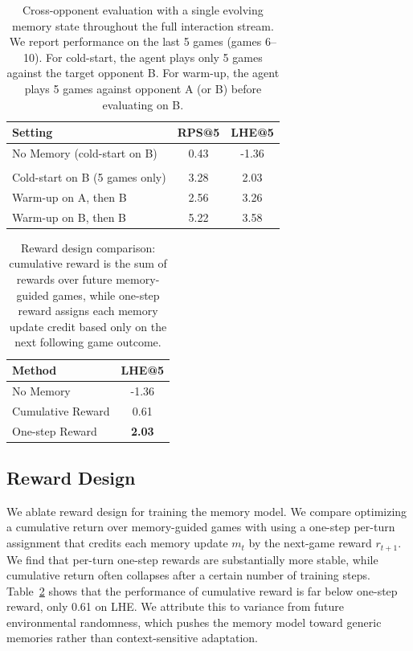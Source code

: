 \documentclass{article}
\newcommand{\methodname}{MemoPilot}
\newcommand{\method}{\textsc{\methodname}}
\theoremstyle{plain}
\theoremstyle{definition}
\theoremstyle{remark}
\begin{document}
\begin{table}[t]
\centering
\caption{Cross-opponent evaluation with a single evolving memory state throughout the full interaction stream. We report performance on the last 5 games (games 6--10). For cold-start, the agent plays only 5 games against the target opponent B. For warm-up, the agent plays 5 games against opponent A (or B) before evaluating on B.}
\label{tab:cross_opponent}
\small
\begin{tabular}{lcc}
\toprule
\textbf{Setting} & \textbf{RPS@5}  & \textbf{LHE@5} \\
\midrule
No Memory (cold-start on B) & 0.43 & -1.36 \\
\midrule
\rowcolor{gray!10} \multicolumn{3}{l}{\textit{Memory w/ \method{}}} \\
Cold-start on B (5 games only) & 3.28 & 2.03 \\
Warm-up on A, then B & 2.56 & 3.26 \\
Warm-up on B, then B & 5.22 & 3.58 \\
\bottomrule
\end{tabular}
\end{table}

\begin{table}[t]
\centering
\caption{Reward design comparison: cumulative reward is the sum of rewards over future memory-guided games, while one-step reward assigns each memory update credit based only on the next following game outcome.}
\small
\label{tab:reward_design}
\begin{tabular}{lc}
\toprule
\textbf{Method}   & \textbf{LHE@5} \\
\midrule
No Memory & -1.36  \\
 Cumulative Reward & 0.61 \\
 One-step Reward& \textbf{2.03}\\
\bottomrule
\end{tabular}
\end{table}

\subsection{Reward Design}
We ablate reward design for training the memory model. We compare optimizing a cumulative return over memory-guided games with using a one-step per-turn assignment that credits each memory update $m_t$ by the next-game reward $r_{t+1}$. We find that per-turn one-step rewards are substantially more stable, while cumulative return often collapses after a certain number of training steps. Table~\ref{tab:reward_design} shows that the performance of cumulative reward is far below one-step reward, only 0.61 on LHE. We attribute this to variance from future environmental randomness, which pushes the memory model toward generic memories rather than context-sensitive adaptation.
\end{document}
